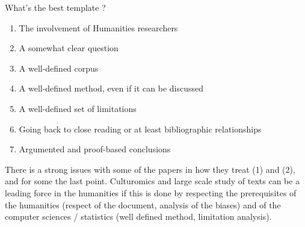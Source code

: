 \documentclass[aspectratio=169]{beamer}
\begin{document}
\begin{frame}{What's the best template ?}

    \begin{enumerate}
        \item The involvement of Humanities researchers
        \item A somewhat clear question
        \item A well-defined corpus
        \item A well-defined method, even if it can be discussed
        \item A well-defined set of limitations
        \item Going back to close reading or at least bibliographic relationships
        \item Argumented and proof-based conclusions
    \end{enumerate}

    There is a strong issues with some of the papers in how they treat (1) and (2), and for some the last point. Culturomics and large scale study of texts can be a leading force in the humanities if this is done by respecting the prerequisites of the humanities (respect of the document, analysis of the biases) and of the computer sciences / statistics (well defined method, limitation analysis).
    
\end{frame}
\end{document}
